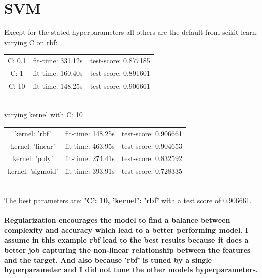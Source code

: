 \documentclass{article}
\begin{document}
\section{SVM}
Except for the stated hyperparameters all others are the default from scikit-learn.
varying C on rbf: \\ 
\begin{tabular}{c | c c}
\hline
C: 0.1 & fit-time: 331.12s & test-score: 0.877185 \\
C: 1 & fit-time: 160.40s & test-score: 0.891601 \\
\rowcolor{LightYellow}
C: 10 & fit-time: 148.25s & test-score: 0.906661 \\
\hline
\end{tabular}
\\ 
varying kernel with C: 10 \\ 
\begin{tabular}{c | c c}
	\hline
	\rowcolor{LightYellow}
	kernel: 'rbf' & fit-time: 148.25s & test-score: 0.906661 \\
	kernel: 'linear' & fit-time: 463.95s & test-score: 0.904653 \\
	kernel: 'poly' & fit-time: 274.41s & test-score: 0.832592 \\
	kernel: 'sigmoid' & fit-time: 393.91s & test-score: 0.728335 \\
	\hline
\end{tabular}
\\ 
The best parameters are: \textbf{'C': 10, 'kernel': 'rbf'} with a test score of 0.906661.

\paragraph[Comment]{
Regularization encourages the model to find a balance between complexity and accuracy which lead to a better performing model.
I assume in this example rbf lead to the best results because it does a better job capturing the non-linear relationship between the features and the target.
And also because 'rbf' is tuned by a single hyperparameter and I did not tune the other models hyperparameters.
}

\end{document}
